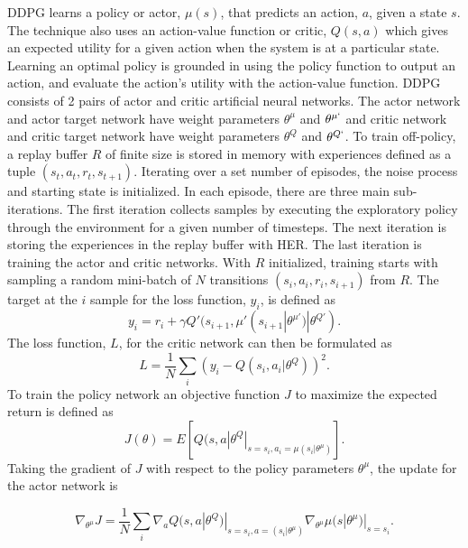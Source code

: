 DDPG learns a policy or actor, $\mu(s)$, that predicts an action, $a$, given a state $s$. The technique also uses an action-value function or critic, $Q(s,a)$ which gives an expected utility for a given action when the system is at a particular state. Learning an optimal policy is grounded in using the policy function to output an action, and evaluate the action's utility with the action-value function. DDPG consists of 2 pairs of actor and critic artificial neural networks. The actor network and actor target network have weight parameters $\theta^\mu$ and $\theta^{\mu`}$ and critic network and critic target network have weight parameters $\theta^Q$ and $\theta^{Q`}$. To train off-policy, a replay buffer $R$ of finite size is stored in memory with experiences defined as a tuple $\left(s_t, a_t, r_t, s_{t+1}  \right)$. Iterating over a set number of episodes, the noise process and starting state is initialized. In each episode, there are three main sub-iterations. The first iteration collects samples by executing the exploratory policy through the environment for a given number of timesteps. The next iteration is storing the experiences in the replay buffer with HER. The last iteration is training the actor and critic networks. With $R$ initialized, training starts with sampling a random mini-batch of $N$ transitions $\left(s_i, a_i, r_i, s_{i+1}  \right)$ from $R$. The target at the $i$ sample for the loss function, $y_i$, is defined as
\begin{equation}
y_i = r_i + \gamma Q'(s_{i+1}, \mu'(s_{i+1} | \theta^{\mu'}) | \theta^{Q'}). \label{eqn:9}
\end{equation}
The loss function, $L$, for the critic network can then be formulated as
\begin{equation}
L = \frac{1}{N} \sum_i \left(y_i - Q(s_i, a_i | \theta^Q) \right)^2. \label{eqn:10}
\end{equation}
To train the policy network an objective function $J$ to maximize the expected return is defined as
\begin{equation}
J(\theta) = E[Q(s,a|\theta^Q|_{s=s_i, a_i = \mu(s_i| \theta^\mu)}]. \label{eqn:12}
\end{equation}
Taking the gradient of $J$ with respect to the policy parameters $\theta^\mu$, the update for the actor network is

\begin{equation}
\nabla_{\theta^\mu}J = \frac{1}{N} \sum_i \nabla_a Q(s,a|\theta^Q) |_{s=s_i,a=(s_i|\theta^\mu)} \nabla_{\theta^\mu} \mu(s|\theta^\mu)|_{s=s_i}. \label{eqn:13}
\end{equation}

